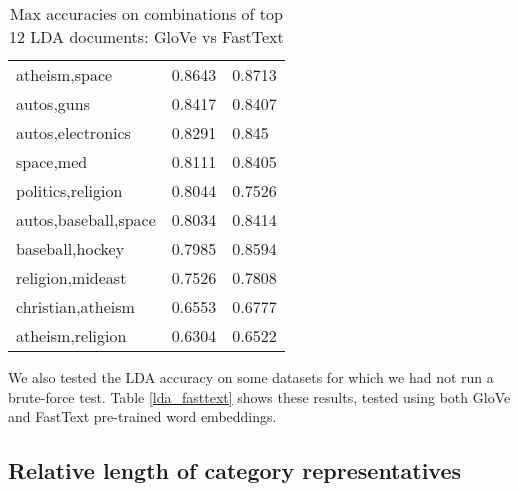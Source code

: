 \begin{table}[]
\begin{tabular}{lll}
atheism,space                              & 0.8643       & 0.8713                 \\
autos,guns                                 & 0.8417       & 0.8407                 \\
autos,electronics                          & 0.8291       & 0.845                  \\
space,med                                  & 0.8111       & 0.8405                 \\
politics,religion                          & 0.8044       & 0.7526                 \\
autos,baseball,space                       & 0.8034       & 0.8414                 \\
baseball,hockey                            & 0.7985       & 0.8594                 \\
religion,mideast                           & 0.7526       & 0.7808                 \\
christian,atheism                          & 0.6553       & 0.6777                 \\
atheism,religion                           & 0.6304       & 0.6522                 \\
\bottomrule
\end{tabular}
\caption{Max accuracies on combinations of top 12 LDA documents: GloVe vs FastText}
\end{table}

We also tested the LDA accuracy on some datasets for which we had not run a brute-force test. Table \ref{lda_fasttext} shows these results, tested using both GloVe and FastText pre-trained word embeddings.

\subsection{Relative length of category representatives}

 
